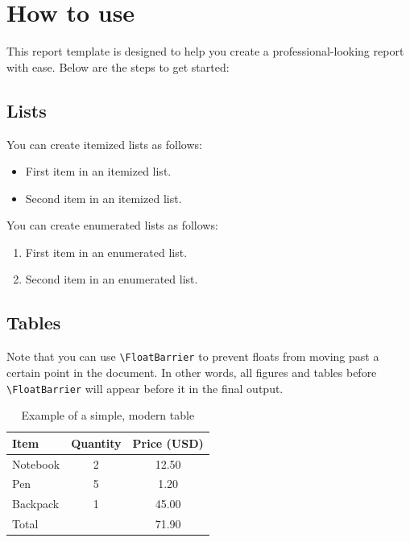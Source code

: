 \section{How to use}
This report template is designed to help you create a professional-looking report with ease. Below are the steps to get started:
\subsection{Lists}
You can create itemized lists as follows:
\begin{itemize}
  \item First item in an itemized list.
  \item Second item in an itemized list.
\end{itemize}
You can create enumerated lists as follows:
\begin{enumerate}
  \item First item in an enumerated list.
  \item Second item in an enumerated list.
\end{enumerate}
\subsection{Tables}
Note that you can use \texttt{\textbackslash FloatBarrier} to prevent floats from moving past a certain point in the document. In other words, all figures and tables before \texttt{\textbackslash FloatBarrier} will appear before it in the final output.
\begin{table}
  \centering
  \caption{Example of a simple, modern table}
  \label{tab:simple-modern}
  \begin{tabular}{lcc}
    \toprule
    Item & Quantity & Price (USD) \\
    \midrule
    Notebook & 2 & 12.50 \\
    Pen & 5 & 1.20 \\
    Backpack & 1 & 45.00 \\
    \midrule
    Total &  & 71.90 \\
    \bottomrule
  \end{tabular}
\end{table}

